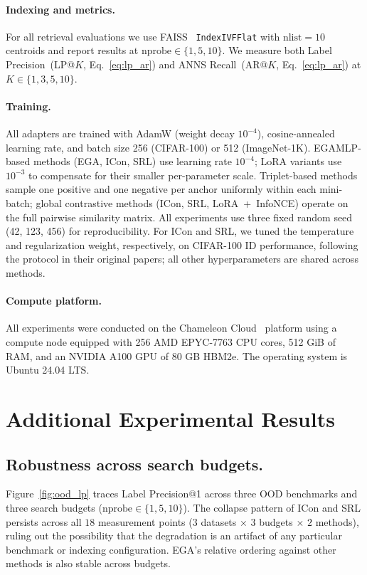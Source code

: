 \documentclass{article}
\begin{document}
\paragraph{Indexing and metrics.}
For all retrieval evaluations we use FAISS~\cite{johnson2019billion} \texttt{IndexIVFFlat} with $\text{nlist}{=}10$ centroids and report results at $\text{nprobe} \in \{1, 5, 10\}$.
We measure both Label Precision~(LP@$K$, Eq.~\eqref{eq:lp_ar}) and ANNS Recall~(AR@$K$, Eq.~\eqref{eq:lp_ar}) at $K \in \{1, 3, 5, 10\}$.

\paragraph{Training.}
All adapters are trained with AdamW (weight decay $10^{-4}$), cosine-annealed learning rate, and batch size 256 (CIFAR-100) or 512 (ImageNet-1K).
EGAMLP-based methods (EGA, ICon, SRL) use learning rate $10^{-4}$; LoRA variants use $10^{-3}$ to compensate for their smaller per-parameter scale.
Triplet-based methods sample one positive and one negative per anchor uniformly within each mini-batch; global contrastive methods (ICon, SRL, LoRA~+~InfoNCE) operate on the full pairwise similarity matrix.
All experiments use three fixed random seed (42, 123, 456) for reproducibility. For ICon and SRL, we tuned the temperature and regularization weight, respectively, on CIFAR-100 ID performance, following the protocol in their original papers; all other hyperparameters are shared across methods.

\paragraph{Compute platform.}
All experiments were conducted on the Chameleon Cloud~\cite{keahey2020lessons} platform using a compute node equipped with 256 AMD EPYC-7763 CPU cores, 512 GiB of RAM, and an NVIDIA A100 GPU of 80 GB HBM2e.
The operating system is Ubuntu 24.04 LTS.

\section{Additional Experimental Results}
\label{sec:more_results}

\subsection{Robustness across search budgets.}
\label{sec:appendix_budget}

Figure~\ref{fig:ood_lp} traces Label Precision@1 across three OOD benchmarks and three search budgets ($\text{nprobe} \in \{1, 5, 10\}$).
The collapse pattern of ICon and SRL persists across all $18$ measurement points ($3$ datasets $\times$ $3$ budgets $\times$ $2$ methods), ruling out the possibility that the degradation is an artifact of any particular benchmark or indexing configuration.
EGA's relative ordering against other methods is also stable across budgets.
\end{document}

